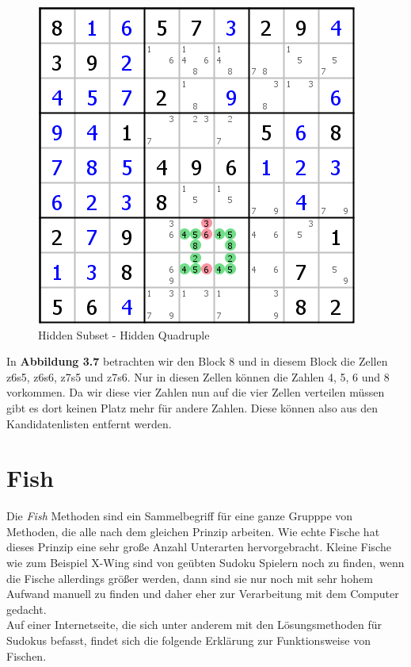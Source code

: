 \documentclass[accentcolor=tud6b,11pt,paper=a4]{tudreport}
\begin{document}
\begin{figure}[h]
\begin{center}
\includegraphics{./img/hidden_subset.png}
\caption{Hidden Subset - Hidden Quadruple}
\end{center}
\end{figure}

In \textbf{Abbildung 3.7} betrachten wir den Block 8 und in diesem Block die Zellen z6s5, z6s6, z7s5 und z7s6. Nur in diesen Zellen können die Zahlen 4, 5, 6 und 8 vorkommen. Da wir diese vier Zahlen nun auf die vier Zellen verteilen müssen gibt es dort keinen Platz mehr für andere Zahlen. Diese können also aus den Kandidatenlisten entfernt werden.


\newpage
\section{Fish}
Die \textit{Fish} Methoden sind ein Sammelbegriff für eine ganze Grupppe von Methoden, die alle nach dem gleichen Prinzip arbeiten. Wie echte Fische hat dieses Prinzip eine sehr große Anzahl Unterarten hervorgebracht. Kleine Fische wie zum Beispiel X-Wing sind von geübten Sudoku Spielern noch zu finden, wenn die Fische allerdings größer werden, dann sind sie nur noch mit sehr hohem Aufwand manuell zu finden und daher eher zur Verarbeitung mit dem Computer gedacht. \\
Auf einer Internetseite, die sich unter anderem mit den Lösungsmethoden für Sudokus befasst, findet sich die folgende Erklärung zur Funktionsweise von Fischen.
\end{document}
